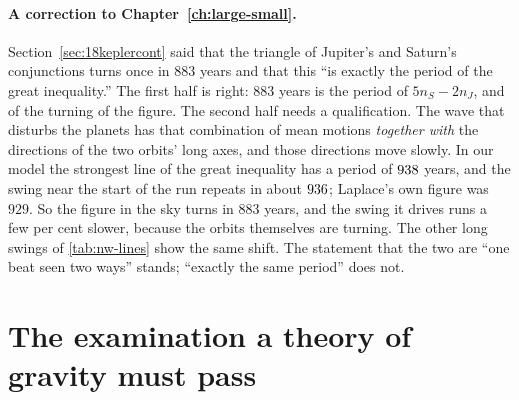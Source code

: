\paragraph{A correction to Chapter~\ref{ch:large-small}.} Section~\ref{sec:18keplercont} said that the triangle of Jupiter's and Saturn's conjunctions turns once in $883$ years and that this ``is exactly the period of the great inequality.'' The first half is right: $883$ years is the period of $5n_S - 2n_J$, and of the turning of the figure. The second half needs a qualification. The wave that disturbs the planets has that combination of mean motions \emph{together with} the directions of the two orbits' long axes, and those directions move slowly. In our model the strongest line of the great inequality has a period of $938$ years, and the swing near the start of the run repeats in about $936$; Laplace's own figure was $929$. So the figure in the sky turns in $883$ years, and the swing it drives runs a few per cent slower, because the orbits themselves are turning. The other long swings of \cref{tab:nw-lines} show the same shift. The statement that the two are ``one beat seen two ways'' stands; ``exactly the same period'' does not.

\section{The examination a theory of gravity must pass}\label{sec:nw-tests}

